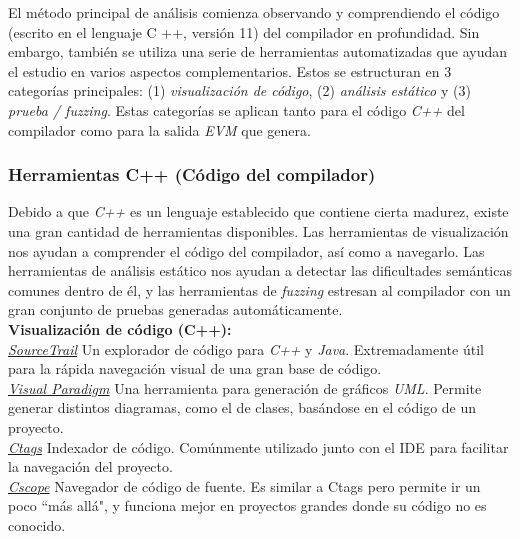 El método principal de análisis comienza observando y comprendiendo el código (escrito en el lenguaje C ++, versión 11) del compilador en profundidad. Sin embargo, también se utiliza una serie de herramientas automatizadas que ayudan el estudio en varios aspectos complementarios. Estos se estructuran en 3 categorías principales: (1) \textit{visualización de código}, (2) \textit{análisis estático} y (3) \textit{prueba / fuzzing}. Estas categorías se aplican tanto para el código \textit{C++} del compilador como para la salida \textit{EVM} que genera.

\subsubsection{Herramientas C++ (Código del compilador)}

Debido a que \textit{C++} es un lenguaje establecido que contiene cierta madurez, existe una gran cantidad de herramientas disponibles. Las herramientas de visualización nos ayudan a comprender el código del compilador, así como a navegarlo. Las herramientas de análisis estático nos ayudan a detectar las dificultades semánticas comunes dentro de él, y las herramientas de \textit{fuzzing} estresan al compilador con un gran conjunto de pruebas generadas automáticamente.\\

\textbf{Visualización de código (C++):}\\

\underline{\textit{SourceTrail}}\cite{SourceTrailLink}
Un explorador de código para \textit{C++} y \textit{Java}. Extremadamente útil para la rápida navegación visual de una gran base de código.\\

\underline{\textit{Visual Paradigm}}\cite{VisualParadigmLink}
Una herramienta para generación de gráficos \textit{UML}. Permite generar distintos diagramas, como el de clases, basándose en el código de un proyecto.\\

\underline{\textit{Ctags}}\cite{CtagsLink}
Indexador de código. Comúnmente utilizado junto con el IDE para facilitar la navegación del proyecto.\\

\underline{\textit{Cscope}}\cite{CscopeLink}
Navegador de código de fuente. Es similar a Ctags pero permite ir un poco ``más allá", y funciona mejor en proyectos grandes donde su código no es conocido.\\

